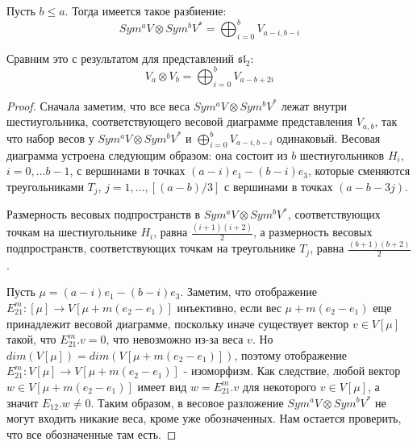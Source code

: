 \documentclass[a4article]{article}
\begin{document}
\begin{theorem}
    Пусть $b \le a$. Тогда имеется такое разбиение:
    \begin{equation}
        Sym^a V \otimes Sym^b V^* = \bigoplus_{i=0}^{b} V_{a-i, b-i}
    \end{equation}
\end{theorem}
\begin{remark}
    Сравним это с результатом для представлений $\mathfrak{sl}_2$:
    \begin{equation}
        V_a \otimes V_b = \bigoplus_{i=0}^{b} V_{a-b + 2i}
    \end{equation}
\end{remark}
\begin{proof}
    Сначала заметим, что все веса $Sym^a V \otimes Sym^b V^*$ лежат внутри шестиугольника, соответствующего весовой диаграмме представления $V_{a,b}$, так что набор весов у $Sym^a V \otimes Sym^b V^*$ и $\bigoplus_{i=0}^{b} V_{a-i, b-i}$ одинаковый. Весовая диаграмма устроена следующим образом: она состоит из $b$ шестиугольников $H_i$, $i=0, \ldots b-1$, с вершинами в точках $(a-i)e_1 - (b-i)e_3$, которые сменяются треугольниками $T_j$, $j = 1, \ldots, [(a-b)/3]$ с вершинами в точках $(a-b-3j)$.

    Размерность весовых подпространств в $Sym^a V \otimes Sym^b V^*$, соответствующих точкам на шестиугольнике $H_i$, равна $\frac{(i+1)(i+2)}{2}$, а размерность весовых подпространств, соответствующих точкам на треугольнике $T_j$, равна $\frac{(b+1)(b+2)}{2}$. 

    Пусть $\mu = (a-i)e_1-(b-i)e_3$.  Заметим, что отображение $E_{21}^m: [\mu] \rightarrow V[\mu+m(e_2-e_1)]$ инъективно, если вес $\mu+m(e_2-e_1)$ еще принадлежит весовой диаграмме, поскольку иначе существует вектор $v \in V[\mu]$ такой, что $E_{21}^m.v=0$, что невозможно из-за веса $v$. Но $dim(V[\mu])=dim(V[\mu+m(e_2-e_1)])$, поэтому отображение $E_{21}^m: V[\mu] \rightarrow V[\mu+m(e_2-e_1)]$ - изоморфизм. Как следствие, любой вектор $w \in V[\mu+m(e_2-e_1)]$ имеет вид $w = E_{21}^m.v$ для некоторого $v \in V[\mu]$, а значит $E_{12}.w \ne 0$. Таким образом, в весовое разложение $Sym^a V \otimes Sym^b V^*$ не могут входить никакие веса, кроме уже обозначенных. Нам остается проверить, что все обозначенные там есть.


\end{proof}
\end{document}
